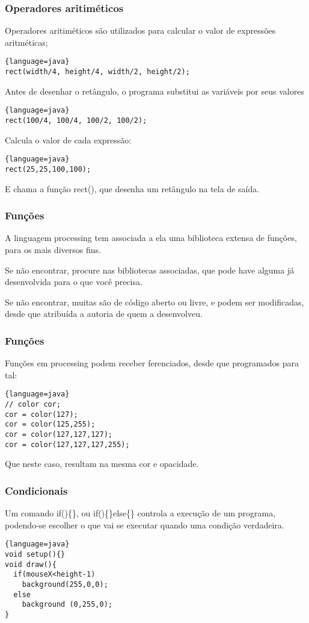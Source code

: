 \documentclass{beamer}
\begin{document}
\begin{frame}[fragile]
\frametitle{Operadores aritiméticos}
Operadores aritiméticos são utilizados para calcular o valor de expressões aritméticas;
\begin{lstlisting}{language=java}
rect(width/4, height/4, width/2, height/2); 
\end{lstlisting}
Antes de desenhar o retângulo, o programa substitui as variáveis por seus valores
\begin{lstlisting}{language=java}
rect(100/4, 100/4, 100/2, 100/2); 
\end{lstlisting}
Calcula o valor de cada expressão:
\begin{lstlisting}{language=java}
rect(25,25,100,100);
\end{lstlisting}
E chama a função rect(), que desenha um retângulo na tela de saída.
\end{frame}

\begin{frame}[fragile]
\frametitle{Funções}
A linguagem processing tem associada a ela uma biblioteca extensa de funções, 
para os mais diversos fins. 

Se não encontrar, procure nas bibliotecas associadas, que pode 
have alguma já desenvolvida para o que você precisa. 

Se não encontrar, muitas são de código aberto ou livre, e podem ser modificadas, desde que atribuída a autoria de quem a desenvolveu. 
\end{frame}

\begin{frame}[fragile]
\frametitle{Funções}
Funções em processing podem receber ferenciados, desde que programados para tal:
\begin{lstlisting}{language=java}
// color cor;
cor = color(127);
cor = color(125,255);
cor = color(127,127,127);
cor = color(127,127,127,255);
\end{lstlisting}
Que neste caso, resultam na mesma cor e opacidade. 
\end{frame}


\begin{frame}[fragile]
\frametitle{Condicionais}
Um comando if()\{\}, ou if()\{\}else\{\} controla a execução de um programa, podendo-se escolher o que vai se executar quando uma condição verdadeira. 
\begin{lstlisting}{language=java}
void setup(){}
void draw(){
  if(mouseX<height-1)
    background(255,0,0);
  else
    background (0,255,0);
}
\end{lstlisting}
\end{frame}
\end{document}
